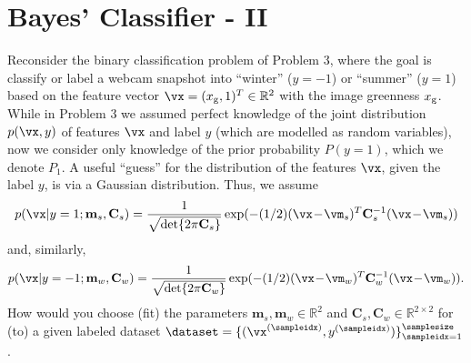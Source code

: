 \documentclass[article,11pt]{article}
\begin{document}
\section{Bayes' Classifier - II}
Reconsider the binary classification problem of Problem 3, where the goal is classify or label a webcam snapshot into ``winter'' ($y=-1$) or ``summer'' ($y=1$) based on the feature vector 
$\vx=(x_{\rm g},1)^{T} \in \mathbb{R}^{2}$ with the image greenness $x_{\rm g}$. While in Problem 3 we assumed perfect knowledge 
of the joint distribution $p(\vx,y)$ of features $\vx$ and label $y$ (which are modelled as random variables), now we consider only knowledge of the prior probability $P(y=1)$, which we denote $P_{1}$. 
A useful ``guess'' for the distribution of the features $\vx$, given the label $y$, is via a Gaussian distribution. Thus, we assume 
\begin{equation}
p(\vx|y=1;\mathbf{m}_{s},\mathbf{C}_{s}) = \frac{1}{\sqrt{\det\{ 2 \pi \mathbf{C}_{s} \}}} \exp(-(1/2) (\vx\!-\!\vm_{s})^{T} \mathbf{C}_{s}^{-1} (\vx\!-\!\vm_{s})) \nonumber
\end{equation}
and, similarly, 
\begin{equation}
p(\vx|y=-1;\mathbf{m}_{w},\mathbf{C}_{w}) = \frac{1}{\sqrt{\det\{ 2 \pi \mathbf{C}_{w} \}}} \exp(-(1/2) (\vx\!-\!\vm_{w})^{T} \mathbf{C}_{w}^{-1} (\vx\!-\!\vm_{w})).  \nonumber
\end{equation} 
How would you choose (fit) the parameters $\mathbf{m}_{s},\mathbf{m}_{w} \in \mathbb{R}^{2}$ and $\mathbf{C}_{s},\mathbf{C}_{w} \in \mathbb{R}^{2 \times 2}$ 
for (to) a given labeled dataset $\dataset = \{ (\vx^{(\sampleidx)},y^{(\sampleidx)}) \}_{\sampleidx=1}^{\samplesize}$.  
\end{document}
